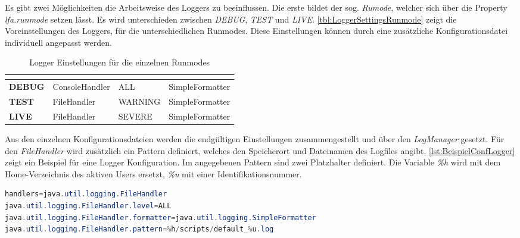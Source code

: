 Es gibt zwei Möglichkeiten die Arbeitsweise des Loggers zu beeinflussen. Die erste bildet der sog. \textit{Rumode}, welcher sich über die Property \textit{lfa.runmode} setzen lässt. Es wird unterschieden zwischen \textit{DEBUG}, \textit{TEST} und \textit{LIVE}. \autoref{tbl:LoggerSettingsRunmode} zeigt die Voreinstellungen des Loggers, für die unterschiedlichen Runmodes. Diese Einstellungen können durch eine zusätzliche Konfigurationsdatei individuell angepasst werden. 

\begin{table}[h]
	\centering
	\begin{tabular}{| l | l | l | l |}
		\hline
		\rowcolor[HTML]{3531FF} 
		\multicolumn{1}{|l|}{\cellcolor[HTML]{4F88BB}{\color[HTML]{FFFFFF} {\bf Runmode}}} & \multicolumn{1}{l|}{\cellcolor[HTML]{4F88BB}{\color[HTML]{FFFFFF} {\bf Handlers}}} & \multicolumn{1}{l|}{\cellcolor[HTML]{4F88BB}{\color[HTML]{FFFFFF} {\bf Loglevel}}} & \multicolumn{1}{l|}{\cellcolor[HTML]{4F88BB}{\color[HTML]{FFFFFF} {\bf Formatter}}} \\ \hline
		\textbf{DEBUG} & ConsoleHandler & ALL & SimpleFormatter \\  \hline
		\textbf{TEST} & FileHandler & WARNING & SimpleFormatter \\ \hline
		\textbf{LIVE} & FileHandler & SEVERE & SimpleFormatter \\  \hline
	\end{tabular}
	\caption{Logger Einstellungen für die einzelnen Runmodes\footnotemark}
	\label{tbl:LoggerSettingsRunmode}
\end{table}

Aus den einzelnen Konfigurationsdateien werden die endgültigen Einstellungen zusammengestellt und über den \textit{LogManager} gesetzt. Für den \textit{FileHandler} wird zusätzlich ein Pattern definiert, welches den Speicherort und Dateinamen des Logfiles angibt. \autoref{lst:BeispielConfLogger} zeigt ein Beispiel für eine Logger Konfiguration. Im angegebenen Pattern sind zwei Platzhalter definiert. Die Variable \textit{\%h} wird mit dem Home-Verzeichnis des aktiven Users ersetzt, \textit{\%u} mit einer Identifikationsnummer. \\

\begin{lstlisting}[language=Java,caption=Beispiel Konfiguration für den Logger,label=lst:BeispielConfLogger]
handlers=java.util.logging.FileHandler
java.util.logging.FileHandler.level=ALL
java.util.logging.FileHandler.formatter=java.util.logging.SimpleFormatter
java.util.logging.FileHandler.pattern=%h/scripts/default_%u.log
\end{lstlisting}


